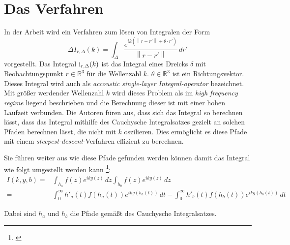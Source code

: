 \chapter{Das Verfahren}\label{algo}


In der Arbeit  wird ein Verfahren zum lösen von Integralen der Form
\begin{equation}
    \Delta
    I_{r,\Delta}(k) = \int_{\Delta}^{}  \frac{e^{ik(\left\lVert r-r'\right\rVert + \theta \cdot r')}}{\left\lVert r-r'\right\rVert} \,dr'
\end{equation}
vorgestellt. Das Integral ${\rm i}_{r,\Delta}(k)$ ist das Integral eines Dreicks $\delta$ mit Beobachtungspunkt $r \in \mathbb{R}^3$ für die Wellenzahl $k$. $\theta \in \mathbb{R}^3$ ist ein Richtungsvektor.
Dieses Integral wird auch als \textit{accoustic single-layer Integral-operator} bezeichnet.
Mit größer werdender Wellenzahl $k$ wird dieses Problem als im \textit{high frequency regime} liegend beschrieben und die Berechnung dieser ist mit einer hohen Laufzeit verbunden.
Die Autoren füren aus, dass sich das Integral so berechnen lässt, dass das Integral mithilfe des Cauchysche Integralsatzes gezielt an solchen Pfaden berechnen lässt, die nicht mit $k$ oszilieren.
Dies ermöglicht es diese Pfade mit einem \textit{steepest-descent}-Verfahren effizient zu berechnen.

Sie führen weiter aus wie diese Pfade gefunden werden können damit das Integral wie folgt umgestellt werden kann \footnote{\cite[Kaptiel 1, Gleichung 4]{gasperini:hal-03209144}}:
\begin{equation}
    \begin{aligned}
        I(k,y,b) = & \int_{h_a}^{} f(z) e^{ikg(z)} \,dz  \int_{h_b}^{} f(z) e^{ikg(z)} \,dz \\
         = & \int_{0}^{\infty} h'_a(t)f(h_a(t))e^{ikg(h_a(t))} \,dt -\int_{0}^{\infty} h'_b(t)f(h_b(t))e^{ikg(h_b(t))} \,dt 
    \end{aligned}
\end{equation}

Dabei sind $h_a$ und $h_b$ die Pfade gemäßt des Cauchysche Integralsatzes. %

